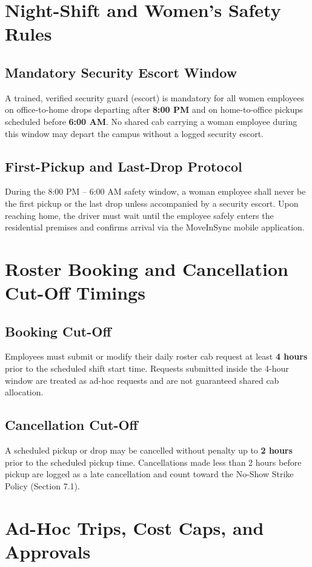 \documentclass[11pt,a4paper]{article}
\begin{document}
\section{Night-Shift and Women's Safety Rules}
\subsection{Mandatory Security Escort Window}
A trained, verified security guard (escort) is mandatory for all women employees on office-to-home drops departing after \textbf{8:00 PM} and on home-to-office pickups scheduled before \textbf{6:00 AM}. No shared cab carrying a woman employee during this window may depart the campus without a logged security escort.

\subsection{First-Pickup and Last-Drop Protocol}
During the 8:00 PM -- 6:00 AM safety window, a woman employee shall never be the first pickup or the last drop unless accompanied by a security escort. Upon reaching home, the driver must wait until the employee safely enters the residential premises and confirms arrival via the MoveInSync mobile application.

\section{Roster Booking and Cancellation Cut-Off Timings}
\subsection{Booking Cut-Off}
Employees must submit or modify their daily roster cab request at least \textbf{4 hours} prior to the scheduled shift start time. Requests submitted inside the 4-hour window are treated as ad-hoc requests and are not guaranteed shared cab allocation.

\subsection{Cancellation Cut-Off}
A scheduled pickup or drop may be cancelled without penalty up to \textbf{2 hours} prior to the scheduled pickup time. Cancellations made less than 2 hours before pickup are logged as a late cancellation and count toward the No-Show Strike Policy (Section 7.1).

\section{Ad-Hoc Trips, Cost Caps, and Approvals}
\end{document}
